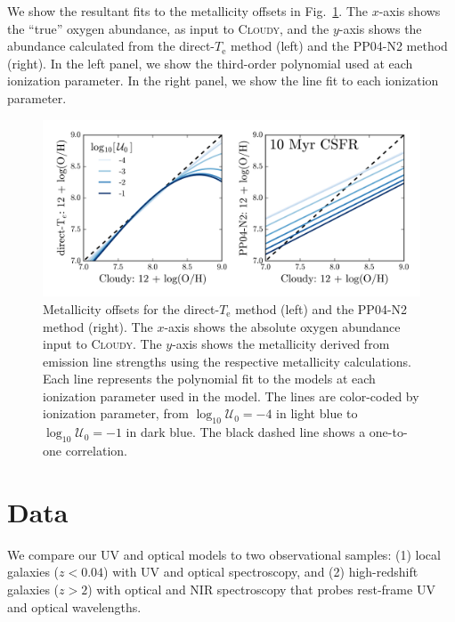 \documentclass[preprint2]{aastex62}
\newcommand{\Cloudy}{\textsc{Cloudy}\xspace}
\newcommand{\logten}{\ensuremath{\log_{10}}}
\newcommand{\logUeq}[1]{\ensuremath{\logten \mathcal{U}_0 = #1}}
\newcommand{\Te}{\ensuremath{T_{\mathrm{e}}}\xspace}
\begin{document}
We show the resultant fits to the metallicity offsets in Fig.~\ref{fig:offset}. The $x$-axis shows the ``true'' oxygen abundance, as input to \Cloudy, and the $y$-axis shows the abundance calculated from the direct-\Te method (left) and the PP04-N2 method (right). In the left panel, we show the third-order polynomial used at each ionization parameter. In the right panel, we show the line fit to each ionization parameter.

\begin{figure}
  \begin{center}
    \includegraphics[width=\linewidth]{figs/f2.png}
    \caption{Metallicity offsets for the direct-\Te method (left) and the PP04-N2 method (right). The $x$-axis shows the absolute oxygen abundance input to \Cloudy. The $y$-axis shows the metallicity derived from emission line strengths using the respective metallicity calculations. Each line represents the polynomial fit to the models at each ionization parameter used in the model. The lines are color-coded by ionization parameter, from \logUeq{-4} in light blue to \logUeq{-1} in dark blue. The black dashed line shows a one-to-one correlation.}
    \label{fig:offset}
  \end{center}
\end{figure}


\section{Data} \label{sec:data}

We compare our UV and optical models to two observational samples: (1) local galaxies ($z<0.04$) with UV and optical spectroscopy, and (2) high-redshift galaxies ($z>2$) with optical and NIR spectroscopy that probes rest-frame UV and optical wavelengths.
\end{document}
